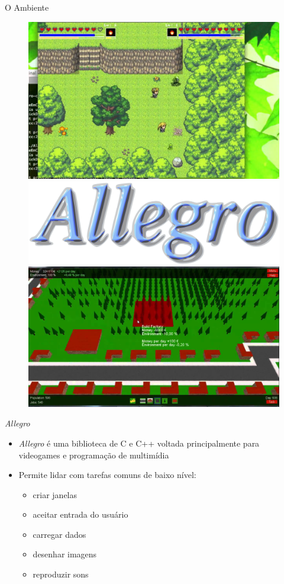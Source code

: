 \documentclass[aspectratio=169]{beamer}
\begin{document}
\begin{frame}{O Ambiente}
\begin{figure}
\centering
\includegraphics[width=.2 \textwidth]{imgs/allegro_game_a.jpg}
\hspace{1cm}
\includegraphics[width=.3 \textwidth]{imgs/allegro-logo.png}
\hspace{1cm}
\includegraphics[width=.2 \textwidth]{imgs/allegro_game_b.jpg}
\end{figure}
\begin{block}{\large{{\textit{Allegro}}}}
	\begin{itemize}
		\item \textit{Allegro} \cite{allegro} é uma biblioteca de C e C++ voltada principalmente para videogames e programação de multimídia 
		\item Permite lidar com tarefas comuns de baixo nível:
		\begin{itemize}
			\item criar janelas
			\item aceitar entrada do usuário
			\item carregar dados
			\item desenhar imagens
			\item reproduzir sons
		\end{itemize}
	\end{itemize}
\end{block}
	
\end{frame}
\end{document}
